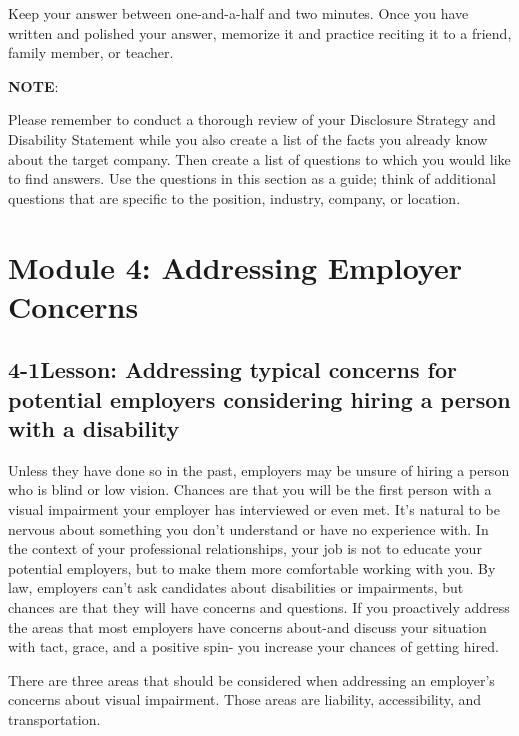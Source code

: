 Keep your answer between one-and-a-half and two minutes. Once you have written and polished your answer, memorize it and practice reciting it to a friend, family member, or teacher.

\textbf{NOTE}:

Please remember to conduct a thorough review of your Disclosure Strategy and Disability Statement while you also create a list of the facts you already know about the target company. Then create a list of questions to which you would like to find answers. Use the questions in this section as a guide; think of additional questions that are specific to the position, industry, company, or location.
  
\pagebreak \section*{Module 4:	Addressing Employer Concerns}
\noindent\makebox[\textwidth]{\rule{\linewidth}{0.4pt}}  \localtableofcontents 
\noindent\makebox[\textwidth]{\rule{\linewidth}{0.4pt}} 


\pagebreak \subsection*{4-1\quad Lesson: Addressing typical concerns for potential employers considering hiring a person with a disability}

Unless they have done so in the past, employers may be unsure of hiring a person who is blind or low vision. Chances are that you will be the first person with a visual impairment your employer has interviewed or even met. It's natural to be nervous about something you don't understand or have no experience with. In the context of your professional relationships, your job is not to educate your potential employers, but to make them more comfortable working with you. By law, employers can't ask candidates about disabilities or impairments, but chances are that they will have concerns and questions. If you proactively address the areas that most employers have concerns about-and discuss your situation with tact, grace, and a positive spin- you increase your chances of getting hired.

There are three areas that should be considered when addressing an employer's concerns about visual impairment. Those areas are liability, accessibility, and transportation.


